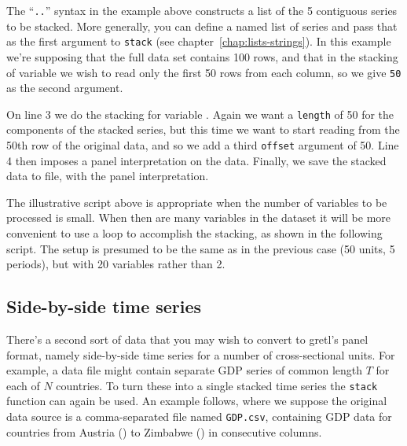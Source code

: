 The ``\texttt{..}'' syntax in the example above constructs a list of
the 5 contiguous series to be stacked.  More generally, you can define
a named list of series and pass that as the first argument to
\texttt{stack} (see chapter~\ref{chap:lists-strings}). In this example
we're supposing that the full data set contains 100 rows, and that in
the stacking of variable  we wish to read only the first
50 rows from each column, so we give \texttt{50} as the second
argument.

On line 3 we do the stacking for variable .  Again we want
a \texttt{length} of 50 for the components of the stacked series, but
this time we want to start reading from the 50th row of the original
data, and so we add a third \texttt{offset} argument of 50.  Line 4
then imposes a panel interpretation on the data. Finally, we save the
stacked data to file, with the panel interpretation.

The illustrative script above is appropriate when the number of
variables to be processed is small.  When then are many variables in
the dataset it will be more convenient to use a loop to accomplish the
stacking, as shown in the following script.  The setup is presumed to
be the same as in the previous case (50 units, 5 periods), but with 20
variables rather than 2.


\subsection{Side-by-side time series}

There's a second sort of data that you may wish to convert to gretl's
panel format, namely side-by-side time series for a number of
cross-sectional units. For example, a data file might contain separate
GDP series of common length $T$ for each of $N$ countries. To turn
these into a single stacked time series the \texttt{stack} function
can again be used. An example follows, where we suppose the original
data source is a comma-separated file named \texttt{GDP.csv},
containing GDP data for countries from Austria () to
Zimbabwe () in consecutive columns.

